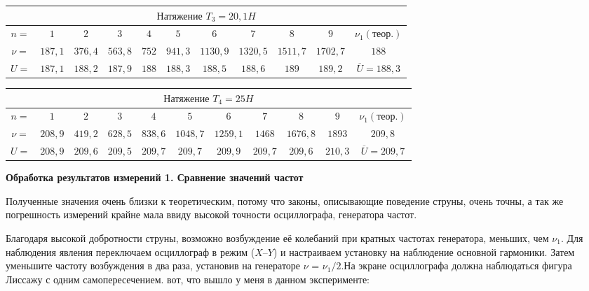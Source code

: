 \documentclass[a4paper,12pt]{article} %
\begin{document}
\begin{center}

\begin{tabular}{|c|c|c|c|c|c|c|c|c|c|c|}
\hline 
\multicolumn{11}{|c|}{$\textbf{Натяжение } T_3 = 20,1 H$ } \\ 
\hline 
$n=$ & $1$ & $2$ & $3$ & $4$ & $5$ & $6$ & $7$ & $8$ & $9$ & $\nu_1(\textbf{теор.})$\\ 
\hline 
$\nu=$ & $187,1$ & $376,4$ & $563,8$ & $752$ & $941,3$ & $1130,9$ & $1320,5$ & $1511,7$ & $1702,7$ & $188$\\
\hline
$U = $ & $187,1$ & $188,2$ & $187,9$ & $188$ & $188,3$ & $188,5$ & $188,6$ & $189$ & $189,2$ & $\overline{U} = 188,3$\\
\hline 
\end{tabular} 

\end{center}

\begin{center}

\begin{tabular}{|c|c|c|c|c|c|c|c|c|c|c|}
\hline 
\multicolumn{11}{|c|}{$\textbf{Натяжение } T_4 = 25 H$ } \\ 
\hline 
$n=$ & $1$ & $2$ & $3$ & $4$ & $5$ & $6$ & $7$ & $8$ & $9$ & $\nu_1(\textbf{теор.})$\\ 
\hline 
$\nu=$ & $208,9$ & $419,2$ & $628,5$ & $838,6$ & $1048,7$ & $1259,1$ & $1468$ & $1676,8$ & $1893$ & $209,8$\\
\hline
$U = $ & $208,9$ & $209,6$ & $209,5$ & $209,7$ & $209,7$ & $209,9$ & $209,7$ & $209,6$ & $210,3$ & $\overline{U} = 209,7$\\
\hline 
\end{tabular} 

\end{center}
{\bf Обработка результатов измерений 1. Сравнение значений частот}

Полученные значения очень близки к теоретическим, потому что законы, описывающие поведение струны, очень точны, а так же погрешность измерений крайне мала ввиду высокой точности осциллографа, генератора частот.

{\bf *}
Благодаря высокой добротности струны, возможно возбуждение её
колебаний при кратных частотах генератора, меньших, чем $\nu_1$. Для наблюдения явления переключаем осциллограф в режим ($X$--$Y$) и настраиваем установку
на наблюдение основной гармоники. Затем уменьшите частоту возбуждения
в два раза, установив на генераторе $\nu$ = $\nu_1/2$.На экране осциллографа должна
наблюдаться фигура Лиссажу с одним самопересечением. вот, что вышло у меня в данном эксперименте:
\end{document}
